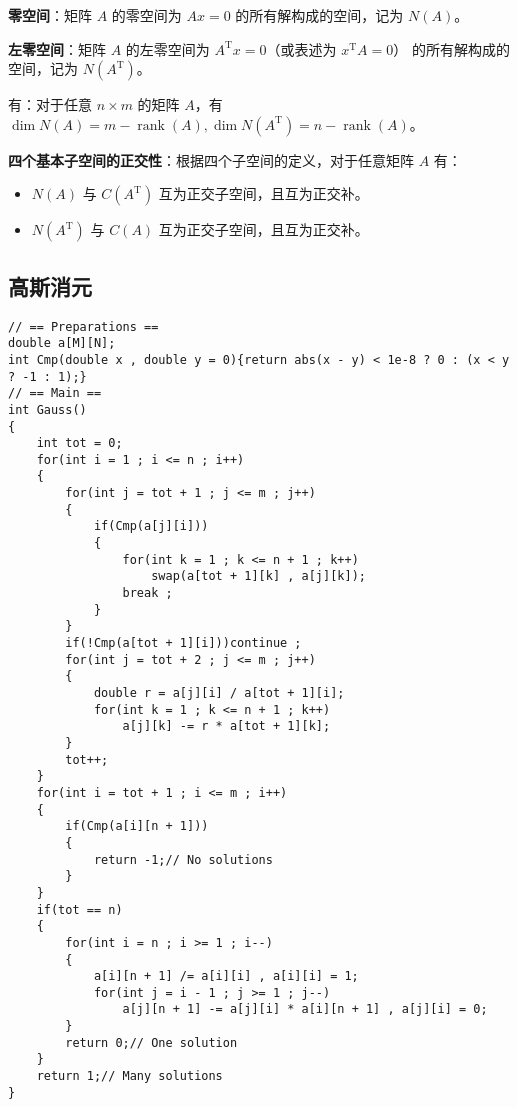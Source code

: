 \begin{tcolorbox}
    \textbf{零空间}：矩阵 $A$ 的零空间为 $Ax=0$ 的所有解构成的空间，记为 $N(A)$。

    \textbf{左零空间}：矩阵 $A$ 的左零空间为 $A^{\mathrm{T}}x=0$（或表述为 $x^{\mathrm{T}}A=0$） 的所有解构成的空间，记为 $N(A^{\mathrm{T}})$。
\end{tcolorbox}

\begin{tcolorbox}
    有：对于任意 $n\times m$ 的矩阵 $A$，有 $\dim N(A)=m-\operatorname{rank}(A),\dim N(A^{\mathrm{T}})=n-\operatorname{rank}(A)$。
\end{tcolorbox}

\begin{tcolorbox}
    \textbf{四个基本子空间的正交性}：根据四个子空间的定义，对于任意矩阵 $A$ 有：
    \begin{itemize}
        \item $N(A)$ 与 $C(A^{\mathrm{T}})$ 互为正交子空间，且互为正交补。
        \item $N(A^{\mathrm{T}})$ 与 $C(A)$ 互为正交子空间，且互为正交补。
    \end{itemize}

\end{tcolorbox}

\subsection{高斯消元}

\begin{verbatim}
// == Preparations ==
double a[M][N];
int Cmp(double x , double y = 0){return abs(x - y) < 1e-8 ? 0 : (x < y ? -1 : 1);}
// == Main ==
int Gauss()
{
    int tot = 0;
    for(int i = 1 ; i <= n ; i++)
    {
        for(int j = tot + 1 ; j <= m ; j++)
        {
            if(Cmp(a[j][i]))
            {
                for(int k = 1 ; k <= n + 1 ; k++)
                    swap(a[tot + 1][k] , a[j][k]);
                break ;
            }
        }
        if(!Cmp(a[tot + 1][i]))continue ;
        for(int j = tot + 2 ; j <= m ; j++)
        {
            double r = a[j][i] / a[tot + 1][i];
            for(int k = 1 ; k <= n + 1 ; k++)
                a[j][k] -= r * a[tot + 1][k];   
        }
        tot++;
    }
    for(int i = tot + 1 ; i <= m ; i++)
    {
        if(Cmp(a[i][n + 1]))
        {
            return -1;// No solutions
        }
    }
    if(tot == n)
    {
        for(int i = n ; i >= 1 ; i--)
        {
            a[i][n + 1] /= a[i][i] , a[i][i] = 1;   
            for(int j = i - 1 ; j >= 1 ; j--)
                a[j][n + 1] -= a[j][i] * a[i][n + 1] , a[j][i] = 0;
        }
        return 0;// One solution
    }
    return 1;// Many solutions
}
\end{verbatim}

